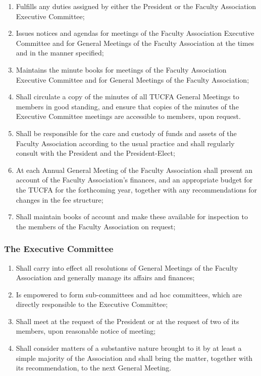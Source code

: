 \documentclass[12pt]{article}
\begin{document}
\begin{enumerate}
\item
Fulfills any duties assigned by either the President or the Faculty Association Executive Committee;
\item
Issues notices and agendas for meetings of the Faculty Association Executive Committee and for General Meetings of the Faculty Association at the times and in the manner specified;
\item
Maintains the minute books for meetings of the Faculty Association Executive Committee and for General Meetings of the Faculty Association;
\item
Shall circulate a copy of the minutes of all TUCFA General Meetings to members in good standing, and ensure that copies of the minutes of the Executive Committee meetings are accessible to members, upon request.
\item
Shall be responsible for the care and custody of funds and assets of the Faculty Association according to the usual practice and shall regularly consult with the President and the President-Elect;
\item
At each Annual General Meeting of the Faculty Association shall present an account of the Faculty Association's finances, and an appropriate budget for the TUCFA for the forthcoming year, together with any recommendations for changes in the fee structure;
\item
Shall maintain books of account and make these available for inspection to the members of the Faculty Association on request;
\end{enumerate}

\subsubsection{The Executive Committee}

\begin{enumerate}
\item
Shall carry into effect all resolutions of General Meetings of the Faculty Association and generally manage its affairs and finances;
\item
Is empowered to form sub-committees and ad hoc committees, which are directly responsible to the Executive Committee;
\item
Shall meet at the request of the President or at the request of two of its members, upon reasonable notice of meeting;
\item
Shall consider matters of a substantive nature brought to it by at least a simple majority of the Association and shall bring the matter, together with its recommendation, to the next General Meeting.
\end{enumerate}
\end{document}
